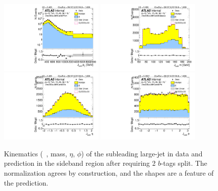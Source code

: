 \begin{figure}[htbp!]
\begin{center}
\includegraphics[width=0.45\textwidth,angle=-90]{figures/boosted/Sideband/b77_TwoTag_split_Sideband_sublHCand_Pt_m_1.pdf}
\includegraphics[width=0.45\textwidth,angle=-90]{figures/boosted/Sideband/b77_TwoTag_split_Sideband_sublHCand_Mass_s.pdf}\\
\includegraphics[width=0.45\textwidth,angle=-90]{figures/boosted/Sideband/b77_TwoTag_split_Sideband_sublHCand_Eta.pdf}
\includegraphics[width=0.45\textwidth,angle=-90]{figures/boosted/Sideband/b77_TwoTag_split_Sideband_sublHCand_Phi.pdf}
  \caption{Kinematics (\pt~, mass, $\eta$, $\phi$) of the subleading large-\R jet in data and prediction in the sideband region after requiring 2 $b$-tags split. The normalization agrees by construction, and the shapes are a feature of the prediction.}
  \label{fig:boosted-2bs-sideband-ak10-subl}
\end{center}
\end{figure}

